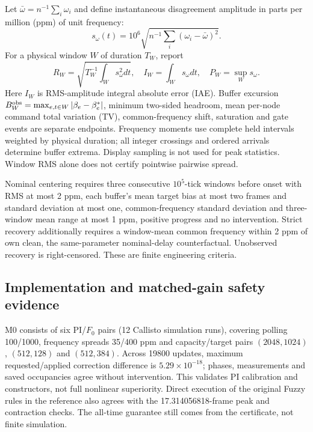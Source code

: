 Let $\bar\omega=n^{-1}\sum_i\omega_i$ and define instantaneous
disagreement amplitude in parts per million (ppm) of unit frequency:
\begin{equation}
 s_\omega(t)=10^6\sqrt{n^{-1}\sum_i(\omega_i-\bar\omega)^2}.
\end{equation}
For a physical window $W$ of duration $T_W$, report
\begin{equation}
 R_W=\sqrt{T_W^{-1}\int_Ws_\omega^2dt},\quad
 I_W=\int_Ws_\omega dt,\quad P_W=\sup_Ws_\omega.
 \label{eq:eval_frequency_metrics}
\end{equation}
Here $I_W$ is RMS-amplitude integral absolute error (IAE).
Buffer excursion $B_W^{\rm obs}=\max_{e,t\in W}|\beta_e-\beta_e^*|$,
minimum two-sided headroom, mean per-node command total variation
(TV), common-frequency shift, saturation and gate events are separate
endpoints. Frequency moments use complete held intervals weighted by
physical duration; all integer crossings and ordered arrivals determine
buffer extrema. Display sampling is not used for peak statistics.
Window RMS alone does not certify pointwise pairwise spread.

Nominal centering requires three consecutive $10^5$-tick windows
before onset with RMS at most 2 ppm, each buffer's mean target bias
at most two frames and standard deviation at most one, common-frequency
standard deviation and three-window mean range at most 1 ppm,
positive progress and no intervention. Strict recovery additionally
requires a window-mean common frequency within 2 ppm of own clean,
the same-parameter nominal-delay counterfactual. Unobserved recovery
is right-censored. These are finite engineering criteria.

\subsection{Implementation and matched-gain safety evidence}
\label{subsec:eval_implementation_reference}
M0 consists of six PI/$F_0$ pairs (12 Callisto simulation runs), covering polling
100/1000, frequency spreads 35/400 ppm and capacity/target pairs
$(2048,1024)$, $(512,128)$ and $(512,384)$. Across 19800 updates,
maximum requested/applied correction difference is
$5.29\times10^{-18}$; phases, measurements and saved occupancies
agree without intervention. This validates PI calibration and
constructors, not full nonlinear superiority. Direct execution of
the original Fuzzy rules in the reference also agrees with the
17.314056818-frame peak and contraction checks. The all-time
guarantee still comes from the certificate, not finite simulation.

